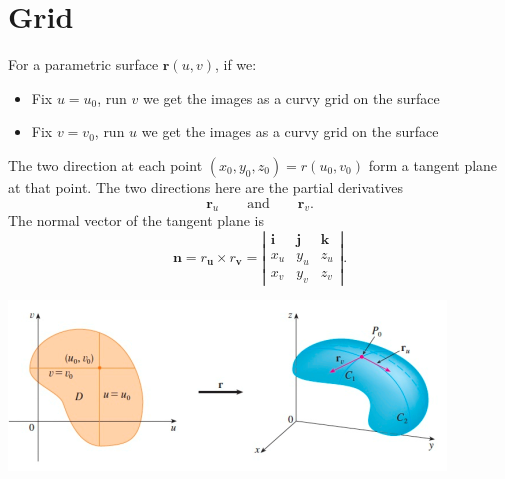 \section{Grid}
For a parametric surface $\textbf{r}(u,v)$, if we:
\begin{itemize}
    \item Fix $u=u_0$, run $v$ we get the images as a curvy grid on the surface
    \item Fix $v=v_0$, run $u$ we get the images as a curvy grid on the surface
\end{itemize}
The two direction at each point $(x_0,y_0,z_0) = r(u_0,v_0)$ form a tangent plane at that point. The two directions here are the partial derivatives
\begin{equation*}
    \textbf{r}_u \qquad \text{and} \qquad \textbf{r}_v.
\end{equation*}
The normal vector of the tangent plane is 
\begin{equation*}
    \textbf{n} = r_\textbf{u}\times r_\textbf{v} = 
    \left|
    \begin{array}{ccc}
         \textbf{i}& \textbf{j} & \textbf{k}  \\
         x_u &  y_u & z_u\\
         x_v &  y_v & z_v
    \end{array}
    \right|.
\end{equation*}
\begin{center}
    \includegraphics[scale=0.8]{images/13-grid.png}
\end{center}

